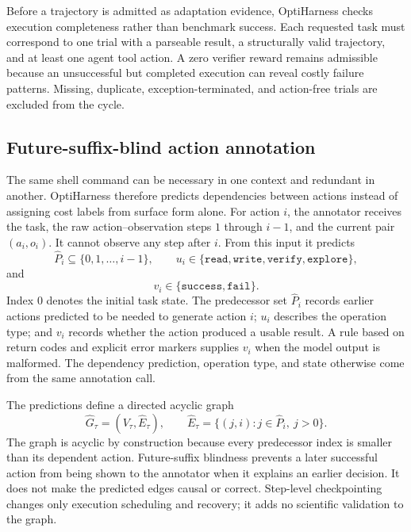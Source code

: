 Before a trajectory is admitted as adaptation evidence, OptiHarness checks execution completeness rather than benchmark success. Each requested task must correspond to one trial with a parseable result, a structurally valid trajectory, and at least one agent tool action. A zero verifier reward remains admissible because an unsuccessful but completed execution can reveal costly failure patterns. Missing, duplicate, exception-terminated, and action-free trials are excluded from the cycle.

\subsection{Future-suffix-blind action annotation}

The same shell command can be necessary in one context and redundant in another. OptiHarness therefore predicts dependencies between actions instead of assigning cost labels from surface form alone. For action $i$, the annotator receives the task, the raw action--observation steps $1$ through $i-1$, and the current pair $(a_i,o_i)$. It cannot observe any step after $i$. From this input it predicts
\begin{equation}
    \widehat P_i\subseteq\{0,1,\ldots,i-1\},\qquad
    u_i\in\{\texttt{read},\texttt{write},\texttt{verify},\texttt{explore}\},
\end{equation}
and
\begin{equation}
    v_i\in\{\texttt{success},\texttt{fail}\}.
\end{equation}
Index $0$ denotes the initial task state. The predecessor set $\widehat P_i$ records earlier actions predicted to be needed to generate action $i$; $u_i$ describes the operation type; and $v_i$ records whether the action produced a usable result. A rule based on return codes and explicit error markers supplies $v_i$ when the model output is malformed. The dependency prediction, operation type, and state otherwise come from the same annotation call.

The predictions define a directed acyclic graph
\begin{equation}
    \widehat G_\tau=(V_\tau,\widehat E_\tau),\qquad
    \widehat E_\tau=\{(j,i):j\in\widehat P_i,\ j>0\}.
\end{equation}
The graph is acyclic by construction because every predecessor index is smaller than its dependent action. Future-suffix blindness prevents a later successful action from being shown to the annotator when it explains an earlier decision. It does not make the predicted edges causal or correct. Step-level checkpointing changes only execution scheduling and recovery; it adds no scientific validation to the graph.

